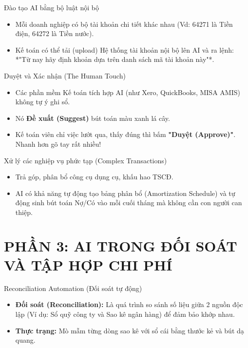 \documentclass[aspectratio=169]{beamer}
\begin{document}
\begin{frame}{Đào tạo AI bằng bộ luật nội bộ}
    \begin{itemize}
        \item Mỗi doanh nghiệp có bộ tài khoản chi tiết khác nhau (Vd: 64271 là Tiền điện, 64272 là Tiền nước).
        \item Kế toán có thể tải (upload) Hệ thống tài khoản nội bộ lên AI và ra lệnh: *"Từ nay hãy định khoản dựa trên danh sách mã tài khoản này"*.
    \end{itemize}
\end{frame}


\begin{frame}{Duyệt và Xác nhận (The Human Touch)}
    \begin{itemize}
        \item Các phần mềm Kế toán tích hợp AI (như Xero, QuickBooks, MISA AMIS) không tự ý ghi sổ.
        \item Nó \textbf{Đề xuất (Suggest)} bút toán màu xanh lá cây.
        \item Kế toán viên chỉ việc lướt qua, thấy đúng thì bấm \textbf{"Duyệt (Approve)"}. Nhanh hơn gõ tay rất nhiều!
    \end{itemize}
\end{frame}


\begin{frame}{Xử lý các nghiệp vụ phức tạp (Complex Transactions)}
    \begin{itemize}
        \item Trả góp, phân bổ công cụ dụng cụ, khấu hao TSCĐ.
        \item AI có khả năng tự động tạo bảng phân bổ (Amortization Schedule) và tự động sinh bút toán Nợ/Có vào mỗi cuối tháng mà không cần con người can thiệp.
    \end{itemize}
\end{frame}


\section{PHẦN 3: AI TRONG ĐỐI SOÁT VÀ TẬP HỢP CHI PHÍ}


\begin{frame}{Reconciliation Automation (Đối soát tự động)}
    \begin{itemize}
        \item \textbf{Đối soát (Reconciliation):} Là quá trình so sánh số liệu giữa 2 nguồn độc lập (Ví dụ: Sổ quỹ công ty và Sao kê ngân hàng) để đảm bảo khớp nhau.
        \item \textbf{Thực trạng:} Mò mẫm từng dòng sao kê với sổ cái bằng thước kẻ và bút dạ quang.
    \end{itemize}
\end{frame}
\end{document}
